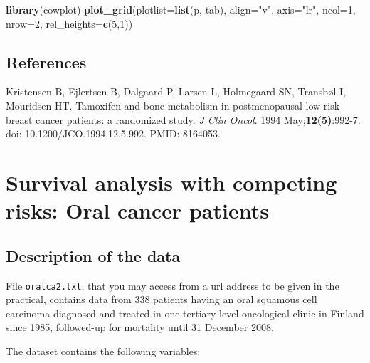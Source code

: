 \documentclass[
]{book}
\newenvironment{Shaded}{\begin{snugshade}}{\end{snugshade}}
\newcommand{\AttributeTok}[1]{\textcolor[rgb]{0.13,0.29,0.53}{#1}}
\newcommand{\DecValTok}[1]{\textcolor[rgb]{0.00,0.00,0.81}{#1}}
\newcommand{\FunctionTok}[1]{\textcolor[rgb]{0.13,0.29,0.53}{\textbf{#1}}}
\newcommand{\NormalTok}[1]{#1}
\newcommand{\StringTok}[1]{\textcolor[rgb]{0.31,0.60,0.02}{#1}}
\begin{document}
\begin{Shaded}
\begin{Highlighting}[]
\FunctionTok{library}\NormalTok{(cowplot)}
\FunctionTok{plot\_grid}\NormalTok{(}\AttributeTok{plotlist=}\FunctionTok{list}\NormalTok{(p, tab), }\AttributeTok{align=}\StringTok{"v"}\NormalTok{, }\AttributeTok{axis=}\StringTok{"lr"}\NormalTok{, }
          \AttributeTok{ncol=}\DecValTok{1}\NormalTok{, }\AttributeTok{nrow=}\DecValTok{2}\NormalTok{, }\AttributeTok{rel\_heights=}\FunctionTok{c}\NormalTok{(}\DecValTok{5}\NormalTok{,}\DecValTok{1}\NormalTok{))}
\end{Highlighting}
\end{Shaded}

\section{References}\label{references}

Kristensen B, Ejlertsen B, Dalgaard P, Larsen L, Holmegaard SN, Transbøl I, Mouridsen HT. Tamoxifen and bone metabolism in postmenopausal low-risk breast cancer patients: a randomized study. \emph{J Clin Oncol}. 1994 May;\textbf{12(5)}:992-7. doi: 10.1200/JCO.1994.12.5.992. PMID: 8164053.

\chapter{Survival analysis with competing risks: Oral cancer patients}\label{survival-analysis-with-competing-risks-oral-cancer-patients}

\section{Description of the data}\label{description-of-the-data}

File \texttt{oralca2.txt}, that you may
access from a url address to be given in the practical, contains data from 338
patients having an oral squamous cell carcinoma diagnosed and treated
in one tertiary level oncological clinic in Finland since 1985, followed-up
for mortality until 31 December 2008.

The dataset contains the following variables:
\end{document}
